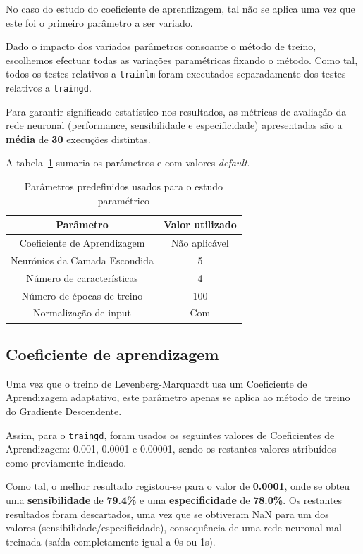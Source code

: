 \documentclass{article}
\begin{document}
No caso do estudo do coeficiente de aprendizagem, tal não se aplica uma vez que este foi o primeiro parâmetro a ser variado.

Dado o impacto dos variados parâmetros consoante o método de treino, escolhemos efectuar todas as variações paramétricas fixando o método. Como tal, todos os testes relativos a \texttt{trainlm} foram executados separadamente dos testes relativos a \texttt{traingd}.

Para garantir significado estatístico nos resultados, as métricas de avaliação da rede neuronal (performance, sensibilidade e especificidade) apresentadas são a \textbf{média} de \textbf{30} execuções distintas.

A tabela~\ref{study_parameters} sumaria os parâmetros e com valores \textit{default}.

\begin{table}[!h]
\centering
	\caption{Parâmetros predefinidos usados para o estudo paramétrico}
	\label{study_parameters}
	\begin{tabular}{|c|c|}
		\hline 
		\textbf{Parâmetro} & \textbf{Valor utilizado} \\ 
		\hline 
		Coeficiente de Aprendizagem & Não aplicável \\ 
		\hline 
		Neurónios da Camada Escondida & 5 \\ 
		\hline 
		Número de características & 4 \\ 
		\hline 
		Número de épocas de treino & 100 \\ 
		\hline 
		Normalização de input & Com \\ 
		\hline 
	\end{tabular} 
\end{table}

\subsection{Coeficiente de aprendizagem}
\indent \indent Uma vez que o treino de Levenberg-Marquardt usa um Coeficiente de Aprendizagem adaptativo, este parâmetro apenas se aplica ao método de treino do Gradiente Descendente.

Assim, para o \texttt{traingd}, foram usados os seguintes valores de Coeficientes de Aprendizagem: 0.001, 0.0001 e 0.00001, sendo os restantes valores atribuídos como previamente indicado.

Como tal, o melhor resultado registou-se para o valor de \textbf{0.0001}, onde se obteu uma \textbf{sensibilidade} de \textbf{79.4\%} e uma \textbf{especificidade} de \textbf{78.0\%}. Os restantes resultados foram descartados, uma vez que se obtiveram NaN para um dos valores (sensibilidade/especificidade), consequência de uma rede neuronal mal treinada (saída completamente igual a 0s ou 1s).
\end{document}
